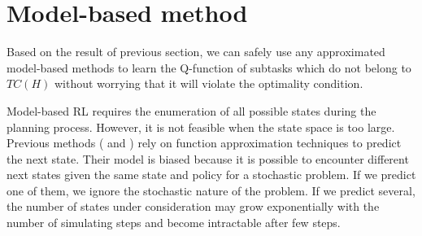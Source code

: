 \documentclass{article} %
\newtheorem{theorem}{Theorem}
\begin{document}








\section{Model-based method}
\label{se:Model}

Based on the result of previous section, we can safely use any approximated model-based methods 
to learn the Q-function of subtasks which do not belong to $TC(H)$ without worrying
that it will violate the optimality condition.

Model-based RL requires the enumeration of all possible states during the planning process.
However, it is not feasible when the state space is too large.
Previous methods (\cite{ApproxDyna} and \cite{ApproxTree}) rely on function approximation
techniques to predict the next state. Their model is biased because it is possible 
to encounter different next states given the same state and policy for a stochastic problem. If we 
predict one of them, we ignore the stochastic nature of the problem. If we predict
several, the number of states under consideration may grow exponentially with the number of simulating steps
and become intractable after few steps.
\end{document}
